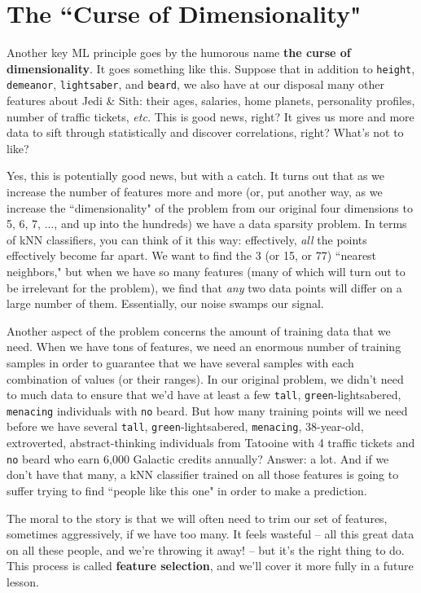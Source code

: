 \documentclass[12pt]{article}
\begin{document}
\section{The ``Curse of Dimensionality"}

Another key ML principle goes by the humorous name \textbf{the curse of
dimensionality}. It goes something like this. Suppose that in addition to
\texttt{height}, \texttt{demeanor}, \texttt{lightsaber}, and \texttt{beard},
we also have at our disposal many other features about Jedi \& Sith: their
ages, salaries, home planets, personality profiles, number of traffic tickets,
\textit{etc.} This is good news, right? It gives us more and more data to sift
through statistically and discover correlations, right? What's not to like?

Yes, this is potentially good news, but with a catch. It turns out that as we
increase the number of features more and more (or, put another way, as we
increase the ``dimensionality" of the problem from our original four
dimensions to 5, 6, 7, ..., and up into the hundreds) we have a data sparsity
problem. In terms of kNN classifiers, you can think of it this way:
effectively, \textit{all} the points effectively become far apart. We want to
find the 3 (or 15, or 77) ``nearest neighbors," but when we have so many
features (many of which will turn out to be irrelevant for the problem), we
find that \textit{any} two data points will differ on a large number of them.
Essentially, our noise swamps our signal.

Another aspect of the problem concerns the amount of training data that we
need. When we have tons of features, we need an enormous number of training
samples in order to guarantee that we have several samples with each
combination of values (or their ranges). In our original problem, we didn't
need to much data to ensure that we'd have at least a few \texttt{tall},
\texttt{green}-lightsabered, \texttt{menacing} individuals with \texttt{no}
beard. But how many training points will we need before we have several
\texttt{tall}, \texttt{green}-lightsabered, \texttt{menacing}, 38-year-old,
extroverted, abstract-thinking individuals from Tatooine with 4 traffic
tickets and \texttt{no} beard who earn 6,000 Galactic credits annually?
Answer: a lot. And if we don't have that many, a kNN classifier trained on all
those features is going to suffer trying to find ``people like this one" in
order to make a prediction.

The moral to the story is that we will often need to trim our set of features,
sometimes aggressively, if we have too many. It feels wasteful -- all this
great data on all these people, and we're throwing it away! -- but it's the
right thing to do. This process is called \textbf{feature selection}, and
we'll cover it more fully in a future lesson.
\end{document}
